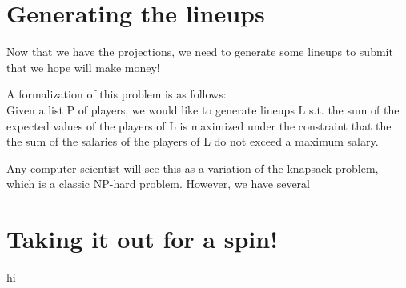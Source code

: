 \documentclass[12pt]{article}
\renewcommand{\=}[1]{\stackrel{#1}{=}} %
\theoremstyle{definition}
\begin{document}
\section{Generating the lineups} 
\label{li}
Now that we have the projections, we need to generate some lineups to submit that we hope will make money!  

A formalization of this problem is as follows: \\
Given a list P of players, we would like to generate lineups L s.t. the sum of the expected values of the players of L is maximized under the constraint that the the sum of the salaries of the players of L do not exceed a maximum salary.  
 
Any computer scientist will see this as a variation of the knapsack problem, which is a classic NP-hard problem.  However, we have several 
\section{Taking it out for a spin!}
\label{ga}
hi
 
\end{document}
